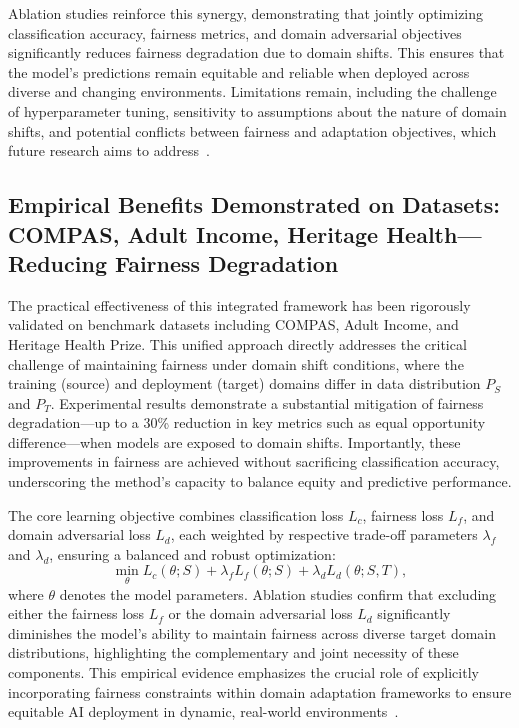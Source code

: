\documentclass[sigconf]{acmart}
\begin{document}
Ablation studies reinforce this synergy, demonstrating that jointly optimizing classification accuracy, fairness metrics, and domain adversarial objectives significantly reduces fairness degradation due to domain shifts. This ensures that the model's predictions remain equitable and reliable when deployed across diverse and changing environments. Limitations remain, including the challenge of hyperparameter tuning, sensitivity to assumptions about the nature of domain shifts, and potential conflicts between fairness and adaptation objectives, which future research aims to address~\cite{ref26}.

\subsection{Empirical Benefits Demonstrated on Datasets: COMPAS, Adult Income, Heritage Health—Reducing Fairness Degradation}

The practical effectiveness of this integrated framework has been rigorously validated on benchmark datasets including COMPAS, Adult Income, and Heritage Health Prize. This unified approach directly addresses the critical challenge of maintaining fairness under domain shift conditions, where the training (source) and deployment (target) domains differ in data distribution \(P_S\) and \(P_T\). Experimental results demonstrate a substantial mitigation of fairness degradation—up to a 30\% reduction in key metrics such as equal opportunity difference—when models are exposed to domain shifts. Importantly, these improvements in fairness are achieved without sacrificing classification accuracy, underscoring the method’s capacity to balance equity and predictive performance.

The core learning objective combines classification loss \(L_c\), fairness loss \(L_f\), and domain adversarial loss \(L_d\), each weighted by respective trade-off parameters \(\lambda_f\) and \(\lambda_d\), ensuring a balanced and robust optimization:
\[
\min_{\theta} L_c(\theta; S) + \lambda_f L_f(\theta; S) + \lambda_d L_d(\theta; S, T),
\]
where \(\theta\) denotes the model parameters. Ablation studies confirm that excluding either the fairness loss \(L_f\) or the domain adversarial loss \(L_d\) significantly diminishes the model’s ability to maintain fairness across diverse target domain distributions, highlighting the complementary and joint necessity of these components. This empirical evidence emphasizes the crucial role of explicitly incorporating fairness constraints within domain adaptation frameworks to ensure equitable AI deployment in dynamic, real-world environments~\cite{ref26}.
\end{document}

